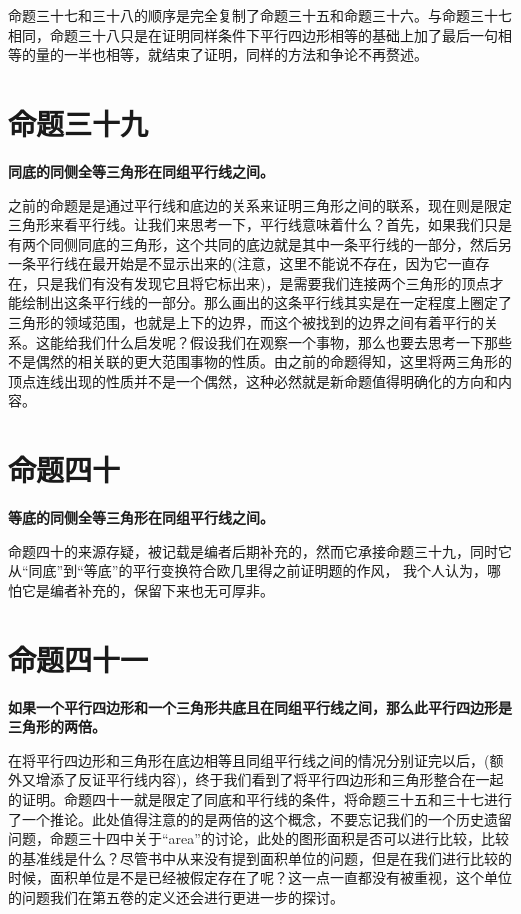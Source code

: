 \documentclass[
]{book}
\begin{document}
命题三十七和三十八的顺序是完全复制了命题三十五和命题三十六。与命题三十七相同，命题三十八只是在证明同样条件下平行四边形相等的基础上加了最后一句相等的量的一半也相等，就结束了证明，同样的方法和争论不再赘述。

\hypertarget{ux547dux9898ux4e09ux5341ux4e5d}{%
\section{命题三十九}\label{ux547dux9898ux4e09ux5341ux4e5d}}

\textbf{同底的同侧全等三角形在同组平行线之间。}

之前的命题是是通过平行线和底边的关系来证明三角形之间的联系，现在则是限定三角形来看平行线。让我们来思考一下，平行线意味着什么？首先，如果我们只是有两个同侧同底的三角形，这个共同的底边就是其中一条平行线的一部分，然后另一条平行线在最开始是不显示出来的(注意，这里不能说不存在，因为它一直存在，只是我们有没有发现它且将它标出来)，是需要我们连接两个三角形的顶点才能绘制出这条平行线的一部分。那么画出的这条平行线其实是在一定程度上圈定了三角形的领域范围，也就是上下的边界，而这个被找到的边界之间有着平行的关系。这能给我们什么启发呢？假设我们在观察一个事物，那么也要去思考一下那些不是偶然的相关联的更大范围事物的性质。由之前的命题得知，这里将两三角形的顶点连线出现的性质并不是一个偶然，这种必然就是新命题值得明确化的方向和内容。

\hypertarget{ux547dux9898ux56dbux5341}{%
\section{命题四十}\label{ux547dux9898ux56dbux5341}}

\textbf{等底的同侧全等三角形在同组平行线之间。}

命题四十的来源存疑，被记载是编者后期补充的，然而它承接命题三十九，同时它从``同底''到``等底''的平行变换符合欧几里得之前证明题的作风， 我个人认为，哪怕它是编者补充的，保留下来也无可厚非。

\hypertarget{ux547dux9898ux56dbux5341ux4e00}{%
\section{命题四十一}\label{ux547dux9898ux56dbux5341ux4e00}}

\textbf{如果一个平行四边形和一个三角形共底且在同组平行线之间，那么此平行四边形是三角形的两倍。}

在将平行四边形和三角形在底边相等且同组平行线之间的情况分别证完以后，(额外又增添了反证平行线内容)，终于我们看到了将平行四边形和三角形整合在一起的证明。命题四十一就是限定了同底和平行线的条件，将命题三十五和三十七进行了一个推论。此处值得注意的的是两倍的这个概念，不要忘记我们的一个历史遗留问题，命题三十四中关于``area''的讨论，此处的图形面积是否可以进行比较，比较的基准线是什么？尽管书中从来没有提到面积单位的问题，但是在我们进行比较的时候，面积单位是不是已经被假定存在了呢？这一点一直都没有被重视，这个单位的问题我们在第五卷的定义还会进行更进一步的探讨。
\end{document}
